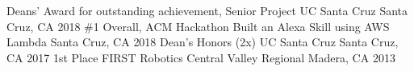 \begin{cvhonors}
  \cvhonor
  {Deans' Award for outstanding achievement, Senior Project}
  {UC Santa Cruz}
  {Santa Cruz, CA}
  {2018}
  \cvhonor
  {\#1 Overall, ACM Hackathon}
  {Built an Alexa Skill using AWS Lambda}
  {Santa Cruz, CA}
  {2018}
  \cvhonor
  {Dean's Honors (2x)}
  {UC Santa Cruz}
  {Santa Cruz, CA}
  {2017}
  \cvhonor
  {1st Place}
  {FIRST Robotics Central Valley Regional}
  {Madera, CA}
  {2013}
\end{cvhonors}